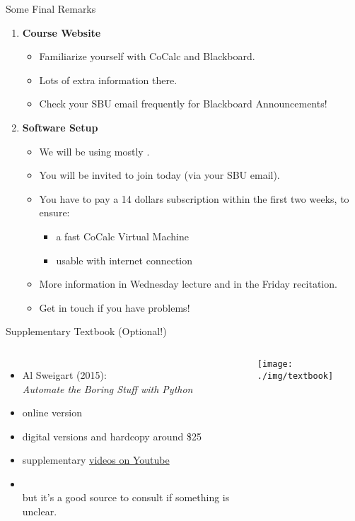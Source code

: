 \documentclass[professionalfonts, xcolor={usenames,svgnames,x11names,table}]{beamer}
\begin{document}
\begin{frame}{Some Final Remarks}
    \begin{enumerate}
        \item \textbf{Course Website}
            \begin{itemize}
                \item Familiarize yourself with CoCalc and Blackboard.
                \item Lots of extra information there.
                        \item Check your SBU email frequently for Blackboard Announcements!
            \end{itemize}
        \item \textbf{Software Setup}
            \begin{itemize}
                \item We will be using mostly .
                \item You will be invited to join today (via your SBU email).
                \item You have to pay a 14 dollars subscription within the first two weeks, to ensure:
                      \begin{itemize}
                      \item a fast CoCalc Virtual Machine
                      \item usable with internet connection
                      \end{itemize}
                \item More information in Wednesday lecture and in the Friday recitation.
                \item Get in touch if you have problems!
            \end{itemize}
    \end{enumerate}
\end{frame}

\begin{frame}{Supplementary Textbook (Optional!)}
    \begin{columns}
            \begin{itemize}
                \item Al Sweigart (2015):\\
                      \emph{Automate the Boring Stuff with Python}
                \item online version 
                \item digital versions and hardcopy around \$25
                \item supplementary \href{https://www.youtube.com/playlist?list=PLGoJzB271_7r-iLYuEHEPJ5pSIYxXjJEn}{videos on Youtube}
                \item {}\\
                      but it's a good source to consult if something is unclear.
            \end{itemize}

            \texttt{[image: ./img/textbook]}
    \end{columns}
\end{frame}
\end{document}

